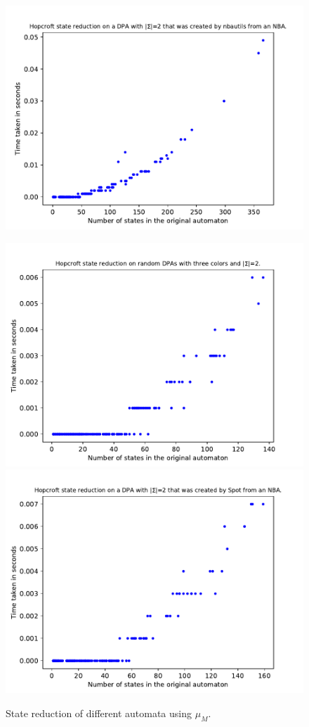 \begin{figure}
\begin{minipage}{0.49\textwidth}
		\includegraphics[page=6,height=.3\textheight]{../data/analysis/hopcroft/detnbaut_ap1.pdf} 
		\caption{State reduction of different automata using $\mu_M$.}
		\label{fig:general:empirical_moore_size_hist}
	\end{minipage}
	\hfill
	\begin{minipage}{0.49\textwidth}
		\includegraphics[page=1,height=.3\textheight]{../data/analysis/hopcroft/gendet_ap1.pdf} 
		\includegraphics[page=1,height=.3\textheight]{../data/analysis/hopcroft/detspot_ap1.pdf} 

\end{minipage}
\end{figure}

